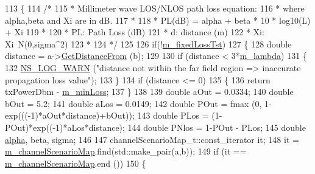 \begin{DoxyCode}
113 \{
114   \textcolor{comment}{/*}
115 \textcolor{comment}{   * Millimeter wave LOS/NLOS path loss equation:}
116 \textcolor{comment}{   * where alpha,beta and Xi are in dB.}
117 \textcolor{comment}{   *}
118 \textcolor{comment}{   * PL(dB) = alpha + beta * 10 * log10(L) + Xi}
119 \textcolor{comment}{   *}
120 \textcolor{comment}{   * PL: Path Loss (dB)}
121 \textcolor{comment}{   * d: distance (m)}
122 \textcolor{comment}{   * Xi: Xi~N(0,sigma^2)}
123 \textcolor{comment}{   *}
124 \textcolor{comment}{   */}
125 
126         \textcolor{keywordflow}{if}(!\hyperlink{classMmWavePropagationLossModel_adfb40829a9026be7819bb25925dc2eb1}{m\_fixedLossTst})
127         \{
128                 \textcolor{keywordtype}{double} distance = a->\hyperlink{classns3_1_1MobilityModel_afa16c20b3c5fd135be075000f0272f31}{GetDistanceFrom} (b);
129 
130                 \textcolor{keywordflow}{if} (distance < 3*\hyperlink{classMmWavePropagationLossModel_a9c28b895c67f0e4e4c7e5c67046baa40}{m\_lambda})
131                 \{
132                         \hyperlink{group__logging_gade7208b4009cdf0e25783cd26766f559}{NS\_LOG\_WARN} (\textcolor{stringliteral}{"distance not within the far field region => inaccurate
       propagation loss value"});
133                 \}
134                 \textcolor{keywordflow}{if} (distance <= 0)
135                 \{
136                         \textcolor{keywordflow}{return} txPowerDbm - \hyperlink{classMmWavePropagationLossModel_a3cba7273e1bb65e9b4c7c918b8f4dd0d}{m\_minLoss};
137                 \}
138 
139                 \textcolor{keywordtype}{double} aOut = 0.0334;
140                 \textcolor{keywordtype}{double} bOut = 5.2;
141                 \textcolor{keywordtype}{double} aLos = 0.0149;
142                 \textcolor{keywordtype}{double} POut = fmax (0, 1-exp(((-1)*aOut*distance)+bOut));
143                 \textcolor{keywordtype}{double} PLos = (1-POut)*exp((-1)*aLos*distance);
144                 \textcolor{keywordtype}{double} PNlos = 1-POut - PLos;
145                 \textcolor{keywordtype}{double} \hyperlink{lte__uplink__power__control_8m_a62197192f0fbf4e0675eb37be1c4c175}{alpha}, beta, sigma;
146 
147                 channelScenarioMap\_t::const\_iterator it;
148                 it = \hyperlink{classMmWavePropagationLossModel_a4de546f00ac6bff5b3a0da6fb8283986}{m\_channelScenarioMap}.find(std::make\_pair(a,b));
149                 \textcolor{keywordflow}{if} (it == \hyperlink{classMmWavePropagationLossModel_a4de546f00ac6bff5b3a0da6fb8283986}{m\_channelScenarioMap}.end ())
150                 \{

\end{DoxyCode}
